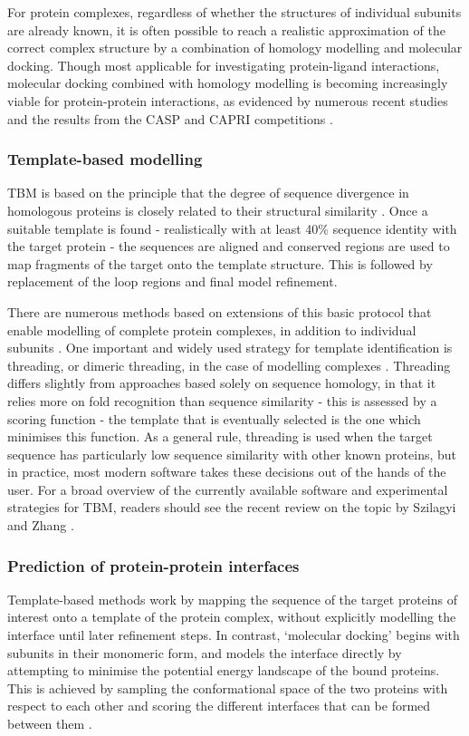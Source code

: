 \documentclass[a4paper,11pt,twoside,openright]{scrbook}
\begin{document}
For protein complexes, regardless of whether the structures of individual subunits are already known, it is often possible to reach a realistic approximation of the correct complex structure by a combination of homology modelling and molecular docking. Though most applicable for investigating protein-ligand interactions, molecular docking combined with homology modelling is becoming increasingly viable for protein-protein interactions, as evidenced by numerous recent studies and the results from the CASP and CAPRI competitions \cite{Jiang2013,Rajapaksha2014,Agostino2016,Lensink2016}.

\subsubsection{Template-based modelling}
TBM is based on the principle that the degree of sequence divergence in homologous proteins is closely related to their structural similarity \cite{Chothia1986}. Once a suitable template is found - realistically with at least 40\% sequence identity with the target protein - the sequences are aligned and conserved regions are used to map fragments of the target onto the template structure. This is followed by replacement of the loop regions and final model refinement.

There are numerous methods based on extensions of this basic protocol that enable modelling of complete protein complexes, in addition to individual subunits \cite{Chen2008,Tuncbag2011,Guerler2013}. One important and widely used strategy for template identification is threading, or dimeric threading, in the case of modelling complexes \cite{Bowie1991,Lu2002}. Threading differs slightly from approaches based solely on sequence homology, in that it relies more on fold recognition than sequence similarity - this is assessed by a scoring function - the template that is eventually selected is the one which minimises this function. As a general rule, threading is used when the target sequence has particularly low sequence similarity with other known proteins, but in practice, most modern software takes these decisions out of the hands of the user. For a broad overview of the currently available software and experimental strategies for TBM, readers should see the recent review on the topic by Szilagyi and Zhang \cite{Szilagyi2014}.

\subsubsection{Prediction of protein-protein interfaces}
Template-based methods work by mapping the sequence of the target proteins of interest onto a template of the protein complex, without explicitly modelling the interface until later refinement steps. In contrast, `molecular docking' begins with subunits in their monomeric form, and models the interface directly by attempting to minimise the potential energy landscape of the bound proteins. This is achieved by sampling the conformational space of the two proteins with respect to each other and scoring the different interfaces that can be formed between them \cite{Huang2014}.
\end{document}
